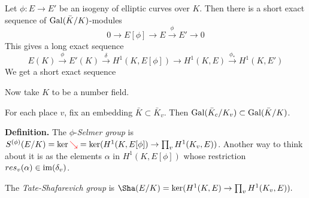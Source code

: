 \documentclass[10pt,a4paper]{article}
\begin{document}
Let $\phi:E \to E'$ be an isogeny of elliptic curves over $K$. Then there is a short exact sequence of $\operatorname{Gal}(\bar{K}/K)$-modules
\[0 \to E[\phi] \to E \xrightarrow{\phi} E' \to 0\]
This gives a long exact sequence
\[E(K) \xrightarrow{\phi} E'(K) \xrightarrow{\delta} H^1(K, E[\phi]) \to H^1(K, E) \xrightarrow{\phi_\ast} H^1(K, E')\]
We get a short exact sequence
\begin{center}
\end{center}
Now take $K$ to be a number field.

For each place $v$, fix an embedding $\bar{K} \subset \bar{K}_v$. Then $\operatorname{Gal}(\bar{K}_c/K_v) \subset \operatorname{Gal}(\bar{K}/K)$.

\textbf{Definition.} The $\phi$-\emph{Selmer group} is $S^{(\phi)}(E/K) = \ker {\textcolor{red} \searrow} = \ker(H^1(K, E[\phi])\to \prod_v H^1(K_v, E))$. Another way to think about it is as the elements $\alpha$ in $H^1(K, E[\phi])$ whose restriction $res_v(\alpha) \in \operatorname{im}(\delta_v)$.

The \emph{Tate-Shafarevich group} is $\Sha(E/K) = \ker(H^1(K,E) \to \prod_v H^1(K_v, E)).$
\end{document}
